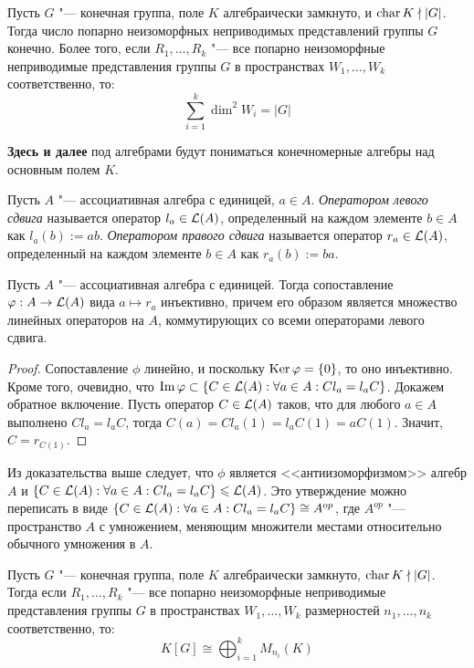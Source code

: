 \begin{corollary}
	Пусть $G$ "--- конечная группа, поле $K$ алгебраически замкнуто, и $\operatorname{char}{K} \nmid |G|$. Тогда число попарно неизоморфных неприводимых представлений группы $G$ конечно. Более того, если $R_1, \dotsc, R_k$ "--- все попарно неизоморфные неприводимые представления группы $G$ в пространствах $W_1, \dotsc, W_k$ соответственно, то:
	\[\sum_{i = 1}^k\dim^2{W_i} = |G|\]
\end{corollary}

\textbf{Здесь и далее} под алгебрами будут пониматься конечномерные алгебры над основным полем $K$.

\begin{definition}
	Пусть $A$ "--- ассоциативная алгебра с единицей, $a \in A$. \textit{Оператором левого сдвига} называется оператор $l_a \in \mathcal L(A)$, определенный на каждом элементе $b \in A$ как $l_a(b) := ab$. \textit{Оператором правого сдвига} называется оператор $r_a \in \mathcal L(A)$, определенный на каждом элементе $b \in A$ как $r_a(b) := ba$.
\end{definition}

\begin{proposition}
	Пусть $A$ "--- ассоциативная алгебра с единицей. Тогда сопоставление $\varphi: A \to \mathcal L(A)$ вида $a \mapsto r_a$ инъективно, причем его образом является множество линейных операторов на $A$, коммутирующих со всеми операторами левого сдвига.
\end{proposition}

\begin{proof}
	Сопоставление $\phi$ линейно, и поскольку $\operatorname{Ker}\varphi = \{0\}$, то оно инъективно. Кроме того, очевидно, что $\operatorname{Im}\varphi \subset \{C\in \mathcal L(A): \forall a \in A: Cl_a = l_aC\}$. Докажем обратное включение. Пусть оператор $C \in \mathcal L(A)$ таков, что для любого $a \in A$ выполнено $Cl_a = l_aC$, тогда $C(a) = Cl_a(1) = l_aC(1) = aC(1)$. Значит, $C = r_{C(1)}$.
\end{proof}

\begin{note}
	Из доказательства выше следует, что $\phi$ является <<антиизоморфизмом>> алгебр $A$ и $\{C\in \mathcal L(A): \forall a \in A: Cl_a = l_aC\} \leqslant \mathcal L(A)$. Это утверждение можно переписать в виде $\{C\in \mathcal L(A): \forall a \in A: Cl_a = l_aC\} \cong A^{op}$, где $A^{op}$ "--- пространство $A$ с умножением, меняющим множители местами относительно обычного умножения в $A$.
\end{note}

\begin{theorem}
	Пусть $G$ "--- конечная группа, поле $K$ алгебраически замкнуто, $\operatorname{char}{K} \nmid |G|$. Тогда если $R_1, \dotsc, R_k$ "--- все попарно неизоморфные неприводимые представления группы $G$ в пространствах $W_1, \dotsc, W_k$ размерностей $n_1, \dotsc, n_k$ соответственно, то:
	\[K[G] \cong \bigoplus_{i=1}^kM_{n_i}(K)\]
\end{theorem}

